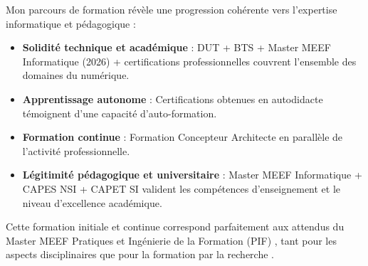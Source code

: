 Mon parcours de formation révèle une progression cohérente vers l'expertise informatique et pédagogique :

\begin{itemize}[leftmargin=*]
    \item \textbf{Solidité technique et académique} : DUT + BTS + Master MEEF Informatique (2026) + certifications professionnelles couvrent l'ensemble des domaines du numérique.
    \item \textbf{Apprentissage autonome} : Certifications obtenues en autodidacte témoignent d'une capacité d'auto-formation.
    \item \textbf{Formation continue} : Formation Concepteur Architecte en parallèle de l'activité professionnelle.
    \item \textbf{Légitimité pédagogique et universitaire} : Master MEEF Informatique + CAPES NSI + CAPET SI valident les compétences d'enseignement et le niveau d'excellence académique.
\end{itemize}

Cette formation initiale et continue correspond parfaitement aux attendus du Master MEEF Pratiques et Ingénierie de la Formation (PIF) \parencite{rncp38152,unicaen}, tant pour les aspects disciplinaires que pour la formation par la recherche \parencite{referentiel_meef}.